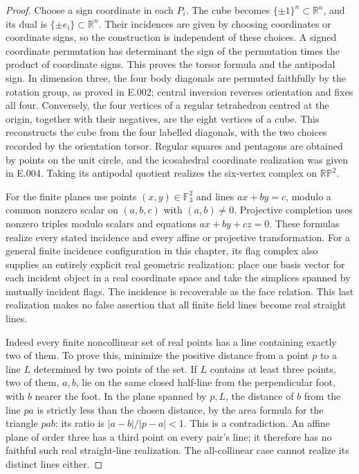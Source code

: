 \begin{proof}
Choose a sign coordinate in each $P_i$. The cube becomes
$\{\pm1\}^n\subset\mathbb R^n$, and its dual is
$\{\pm e_i\}\subset\mathbb R^n$. Their incidences are given by choosing
coordinates or coordinate signs, so the construction is independent of
these choices. A signed coordinate permutation has determinant the sign
of the permutation times the product of coordinate signs. This proves
the torsor formula and the antipodal sign. In dimension three, the four
body diagonals are permuted faithfully by the rotation group, as proved
in E.002; central inversion reverses orientation and fixes all four.
Conversely, the four vertices of a regular tetrahedron centred at the
origin, together with their negatives, are the eight vertices of a cube.
This reconstructs the cube from the four labelled diagonals, with the
two choices recorded by the orientation torsor. Regular squares and
pentagons are obtained by points on the unit circle, and the icosahedral
coordinate realization was given in E.004. Taking its antipodal quotient
realizes the six-vertex complex on $\mathbb R\mathbb P^2$.

For the finite planes use points $(x,y)\in\mathbb F_3^2$ and lines
$ax+by=c$, modulo a common nonzero scalar on $(a,b,c)$ with $(a,b)\ne0$.
Projective completion uses nonzero triples modulo scalars and equations
$ax+by+cz=0$. These formulas realize every stated incidence and every
affine or projective transformation. For a general finite incidence
configuration in this chapter, its flag complex also supplies an entirely
explicit real geometric realization: place one basis vector for each
incident object in a real coordinate space and take the simplices spanned
by mutually incident flags. The incidence is recoverable as the face
relation. This last realization makes no false assertion that all finite
field lines become real straight lines.

Indeed every finite noncollinear set of real points has a line containing
exactly two of them. To prove this, minimize the positive distance from
a point $p$ to a line $L$ determined by two points of the set. If $L$
contains at least three points, two of them, $a,b$, lie on the same
closed half-line from the perpendicular foot, with $b$ nearer the foot.
In the plane spanned by $p,L$, the distance of $b$ from the line $pa$ is
strictly less than the chosen distance, by the area formula for the
triangle $pab$: its ratio is $|a-b|/|p-a|<1$. This is a contradiction.
An affine plane of order three has a third point on every pair's line;
it therefore has no faithful such real straight-line realization. The
all-collinear case cannot realize its distinct lines either.


\end{proof}

